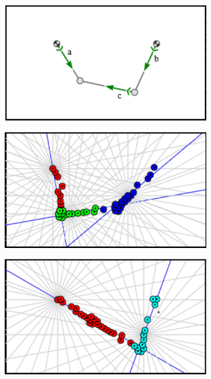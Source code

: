 \begin{figure}
    \centering
    \begin{subfigure}[t]{0.24\textwidth}
        \includegraphics[width=\textwidth]{gfx/gruppe1_2_0.png}
        \caption{}
        \label{fig:gruppe1_2_0}
    \end{subfigure}
    \begin{subfigure}[t]{0.24\textwidth}
        \includegraphics[width=\textwidth]{gfx/gruppe1_2_1.png}
        \caption{}
        \label{fig:gruppe1_2_1}
    \end{subfigure}
    \begin{subfigure}[t]{0.24\textwidth}
        \includegraphics[width=\textwidth]{gfx/gruppe1_2_2.png}

\end{subfigure}
\end{figure}
